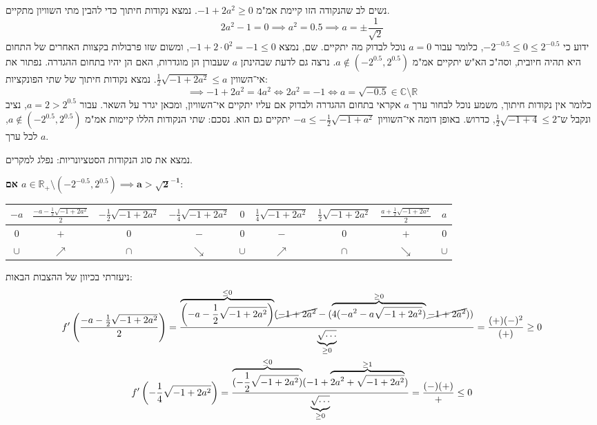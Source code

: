 \documentclass[]{article}
\newcommand\R     {\mathbb{R}}
\newcommand\C     {\mathbb{C}}
\newcommand\cl [1]    {\left ( #1 \right )}
\begin{document}
\begin{enumerate}
\begin{itemize}
				נשים לב שהנקודה הזו קיימת אמ"מ $-1 + 2a^2 \ge 0$. נמצא נקודות חיתוך כדי להבין מתי השוויון מתקיים. 
				\[2a^2 -1 = 0 \implies a^2 = 0.5 \implies a = \pm \frac{1}{\sqrt 2}\]
				ידוע כי $-2^{-0.5} \le 0 \le 2^{-0.5}$, כלומר עבור $a = 0$ נוכל לבדוק מה יתקיים. שם, נמצא $-1 + 2 \cdot 0^2 = -1 \le 0$, ומשום שזו פרבולות בקצוות האחרים של התחום היא תהיה חיובית, וסה"כ הא"ש יתקיים אמ"מ $a \notin (-2^{0.5}, 2^{0.5})$. נרצה גם לדעת שבהינתן $a$ שעבורן הן מוגדרות, האם הן יהיו בתחום ההגדרה. נפתור את אי־השווין $\frac{1}{2}\sqrt{-1 + 2a^2} \le a $. נמצא נקודות חיתוך של שתי הפונקציות: 
				\[ \implies -1 + 2a^2 = 4a^2 \iff 2a^2 = -1 \iff a = \sqrt{-0.5} \in \C \setminus \R \]
				כלומר אין נקודות חיתוך, משמע נוכל לבחור ערך $a$ אקראי בתחום ההגדרה ולבדוק אם עליו יתקיים אי־השוויון, ומכאן יגרר על השאר. עבור $a = 2 > 2^{0.5}$, נציב ונקבל ש־$\frac{1}{2}\sqrt{-1 + 4} \le  2$, כדרוש. באופן דומה אי־השוויון $-a \le -\frac{1}{2}\sqrt{-1 + a^2}$ יתקיים גם הוא. נסכם: שתי הנקודות הללו קיימות אמ"מ $a \notin (-2^{0.5}, 2^{0.5})$, לכל ערך $a$. 
				
				
				נמצא את סוג הנקודות הסטציונריות: נפלג למקרים. 
				
				\textbf{אם $a \in \R_+ \setminus (-2^{-0.5}, 2^{0.5}) \implies \bm{a > \sqrt{2}^{-1}}$}: 
				\begin{center}
					\begin{tabular}{|c|c|c|c|c|c|c|c|c|}
						\hline $-a$ & $\frac{- a - \frac{1}{2}\sqrt{-1 + 2a^2}}{2}$ & $- \frac{1}{2}\sqrt{-1 + 2a^2}$ & $- \frac{1}{4}\sqrt{-1 + 2a^2}$ & $0$ & $\frac{1}{4}\sqrt{-1 + 2a^2}$ & $\frac{1}{2}\sqrt{-1 + 2a^2}$ & $\frac{a + \frac{1}{2}\sqrt{-1 + 2a^2}}{2}$ & $a$ \\
						\hline $0$ & $+$ & $0$ & $-$ & $0$ & $-$ & $0$ & $+$ & $0$ \\
						\hline $\cup$ & $\nearrow$ & $\cap$ & $\searrow$ & $\cup $ & $\nearrow$ & $\cap$ & $\searrow$ & $\cup$ \\
						\hline 
					\end{tabular}
				\end{center}
				ניעזרתי בכיוון של ההצבות הבאות: 
				\begin{gather*}
					f'\cl{\frac{- a - \frac{1}{2}\sqrt{-1 + 2a^2}}{2}} = \frac{\overbrace{\cl{- a - \frac{1}{2}\sqrt{-1 + 2a^2}}}^{\le 0}(\cancel{- 1 + 2a^2} - (\overbrace{4(-a^2 - a\sqrt{-1 + 2a^2})}^{\ge 0} \cancel{-1+ 2a^2}) )}{\underbrace{\sqrt{\dots}}_{\ge 0}} = \frac{(+)(-)^2}{(+)} \ge 0 \\
					f'\cl{- \frac{1}{4}\sqrt{-1 + 2a^2}} = \frac{\overbrace{(- \frac{1}{2}\sqrt{-1 + 2a^2})}^{\le 0}(-1 + \overbrace{2a^2 + \sqrt{-1 + 2a^2}}^{\ge 1})}{\underbrace{\sqrt{\dots}}_{\ge 0}} = \frac{(-)(+)}{+} \le 0
				\end{gather*}
				

\end{itemize}
\end{enumerate}
\end{document}
